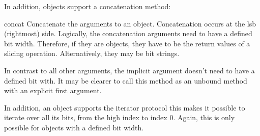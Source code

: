 In addition,  objects support a concatenation method:

\begin{methoddesc}[intbv]{concat}{}
Concatenate the arguments to an  object. Concatenation
occurs at the lsb (rightmost) side. Logically, the concatenation
arguments need to have a defined bit width. Therefore, if they are
 objects, they have to be the return values of a slicing
operation. Alternatively, they may be bit strings.

In contrast to all other arguments, the implicit  argument
doesn't need to have a defined bit with.  It may be clearer to call
this method as an unbound method with an explicit first 
argument.
\end{methoddesc}

In addition, an  object supports the iterator protocol this
makes it possible to iterate over all its bits, from the high index to
index 0. Again, this is only possible for  objects with a
defined bit width.











